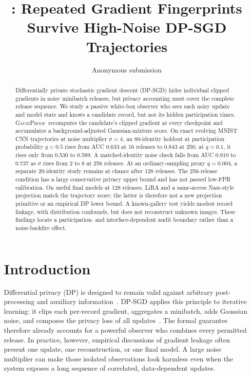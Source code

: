 \documentclass[conference]{IEEEtran}
\title{\method: Repeated Gradient Fingerprints Survive High-Noise DP-SGD Trajectories}
\author{Anonymous submission}
\newcommand{\method}{\textsc{GaussProof}}
\begin{document}
\maketitle

\begin{abstract}
Differentially private stochastic gradient descent (DP-SGD) hides individual clipped gradients in noisy minibatch releases, but privacy accounting must cover the complete release sequence. We study a passive white-box observer who sees each noisy update and model state and knows a candidate record, but not its hidden participation times. \method\ recomputes the candidate's clipped gradient at every checkpoint and accumulates a background-adjusted Gaussian-mixture score. On exact evolving MNIST CNN trajectories at noise multiplier $\sigma=4$, an 80-identity holdout at participation probability $q=0.5$ rises from AUC 0.633 at 16 releases to 0.843 at 256; at $q=0.1$, it rises only from 0.530 to 0.589. A matched-identity noise check falls from AUC 0.910 to 0.737 as $\sigma$ rises from 2 to 8 at 256 releases. At an ordinary-sampling proxy $q=0.004$, a separate 20-identity study remains at chance after 128 releases. The 256-release condition has a large conservative privacy upper bound and has not passed low-FPR calibration. On useful final models at 128 releases, LiRA and a same-access Nasr-style projection match the trajectory score; the latter is therefore not a new projection primitive or an empirical DP lower bound. A known-gallery test yields modest record linkage, with distribution confounds, but does not reconstruct unknown images. These findings locate a participation- and interface-dependent audit boundary rather than a noise-backfire effect.
\end{abstract}


\section{Introduction}

Differential privacy (DP) is designed to remain valid against arbitrary post-processing and auxiliary information~\cite{dwork2006calibrating,dwork2014algorithmic}. DP-SGD applies this principle to iterative learning: it clips each per-record gradient, aggregates a minibatch, adds Gaussian noise, and composes the privacy loss of all updates~\cite{abadi2016deep}. The formal guarantee therefore already accounts for a powerful observer who combines every permitted release. In practice, however, empirical discussions of gradient leakage often present one update, one reconstruction, or one final model. A large noise multiplier can make those isolated observations look harmless even when the system exposes a long sequence of correlated, data-dependent updates.
\end{document}
